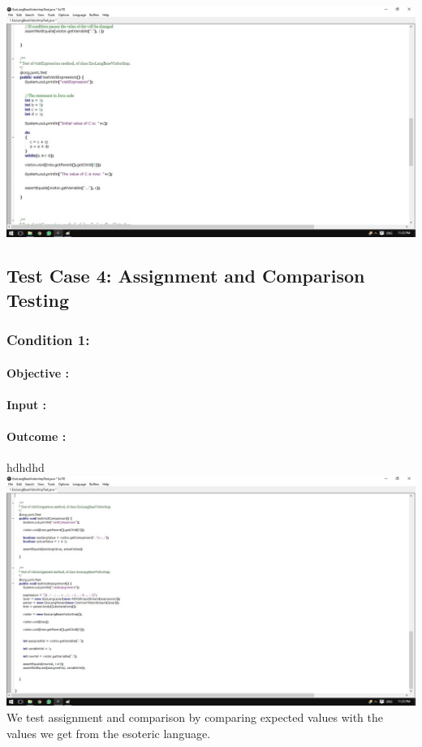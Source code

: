 \documentclass[english]{article}
\begin{document}
			\includegraphics[width=\linewidth]{test3.jpg}
			\\[12pt]		
		 	
			\subsection{Test Case 4: Assignment and Comparison Testing}
			\subsubsection{Condition 1: }
			\paragraph{Objective :}
			\paragraph{Input :}
			\paragraph{Outcome :}hdhdhd\\
			\includegraphics[width=\linewidth]{test4.jpg}
			\\[12pt]
			We test assignment and comparison by comparing expected values with the values we get from the esoteric language.	
	
\end{document}
